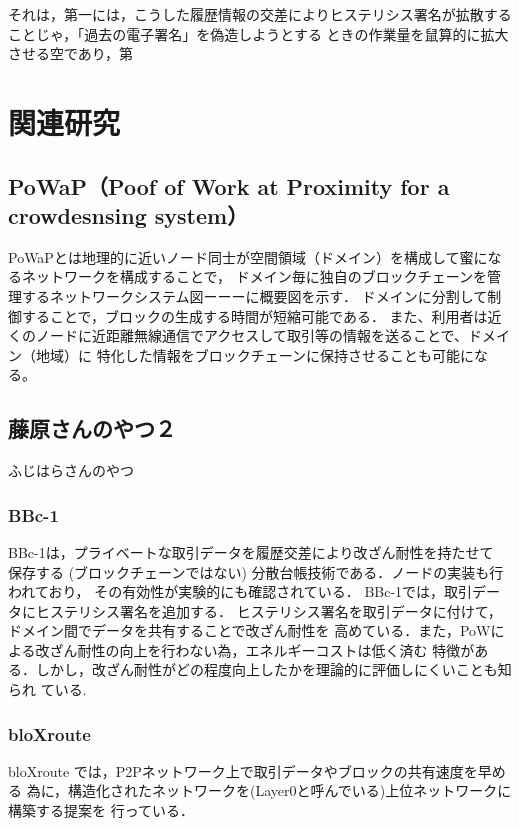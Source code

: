 \documentclass[a4paper,12pt]{jsarticle}
\begin{document}
それは，第一には，こうした履歴情報の交差によりヒステリシス署名が拡散することじゃ，「過去の電子署名」を偽造しようとする
ときの作業量を鼠算的に拡大させる空であり，第


\section{関連研究}
      \subsection{PoWaP（Poof of Work at Proximity for a crowdesnsing system）}
PoWaPとは地理的に近いノード同士が空間領域（ドメイン）を構成して蜜になるネットワークを構成することで，
ドメイン毎に独自のブロックチェーンを管理するネットワークシステム図ーーーに概要図を示す．
ドメインに分割して制御することで，ブロックの生成する時間が短縮可能である．
また、利用者は近くのノードに近距離無線通信でアクセスして取引等の情報を送ることで、ドメイン（地域）に
特化した情報をブロックチェーンに保持させることも可能になる。



      \subsection{藤原さんのやつ２}
ふじはらさんのやつ

      \subsubsection{BBc-1}

BBc-1\cite{saito}は，プライベートな取引データを履歴交差により改ざん耐性を持たせて
保存する (ブロックチェーンではない) 分散台帳技術である．ノードの実装も行われており，
その有効性が実験的にも確認されている．
BBc-1では，取引データにヒステリシス署名を追加する．
ヒステリシス署名を取引データに付けて，ドメイン間でデータを共有することで改ざん耐性を
高めている．また，PoWによる改ざん耐性の向上を行わない為，エネルギーコストは低く済む
特徴がある．しかし，改ざん耐性がどの程度向上したかを理論的に評価しにくいことも知られ
ている. 

      \subsubsection{bloXroute}
bloXroute \cite{bloX} では，P2Pネットワーク上で取引データやブロックの共有速度を早める
為に，構造化されたネットワークを(Layer0と呼んでいる)上位ネットワークに構築する提案を
行っている．
\end{document}
